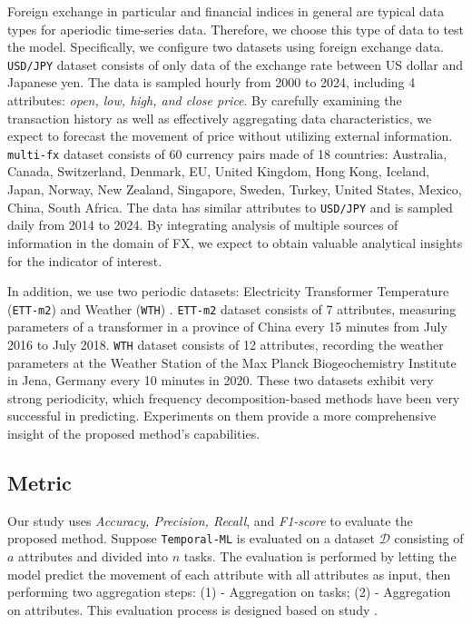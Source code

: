 \documentclass[a4paper,fleqn]{cas-sc}
\begin{document}
Foreign exchange in particular and financial indices in general are typical data types for aperiodic time-series data. Therefore, we choose this type of data to test the model. Specifically, we configure two datasets using foreign exchange data. \verb|USD/JPY| dataset consists of only data of the exchange rate between US dollar and Japanese yen. The data is sampled hourly from 2000 to 2024, including 4 attributes: \textit{open, low, high, and close price}. By carefully examining the transaction history as well as effectively aggregating data characteristics, we expect to forecast the movement of price without utilizing external information. \verb|multi-fx| dataset consists of 60 currency pairs made of 18 countries: Australia, Canada, Switzerland, Denmark, EU, United Kingdom, Hong Kong, Iceland, Japan, Norway, New Zealand, Singapore, Sweden, Turkey, United States, Mexico, China, South Africa. The data has similar attributes to \verb|USD/JPY| and is sampled daily from 2014 to 2024. By integrating analysis of multiple sources of information in the domain of FX, we expect to obtain valuable analytical insights for the indicator of interest.

\vspace{1mm}

In addition, we use two periodic datasets: Electricity Transformer Temperature (\verb|ETT-m2|) \cite{zhou2021informer} and Weather (\verb|WTH|) \cite{Kolle}. \verb|ETT-m2| dataset consists of 7 attributes, measuring parameters of a transformer in a province of China every 15 minutes from July 2016 to July 2018. \verb|WTH| dataset consists of 12 attributes, recording the weather parameters at the Weather Station of the Max Planck Biogeochemistry Institute in Jena, Germany every 10 minutes in 2020. These two datasets exhibit very strong periodicity, which frequency decomposition-based methods have been very successful in predicting. Experiments on them provide a more comprehensive insight of the proposed method's capabilities.

\subsection{Metric}

Our study uses \textit{Accuracy, Precision, Recall}, and \textit{F1-score} to evaluate the proposed method. Suppose \verb|Temporal-ML| is evaluated on a dataset $\mathcal{D}$ consisting of $a$ attributes and divided into $n$ tasks. The evaluation is performed by letting the model predict the movement of each attribute with all attributes as input, then performing two aggregation steps: (1) - Aggregation on tasks; (2) - Aggregation on attributes. This evaluation process is designed based on study \cite{challu2023nhits}.
\end{document}
